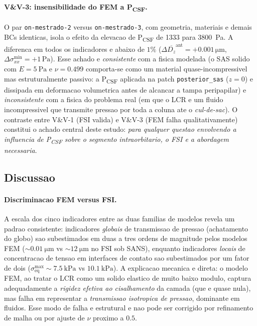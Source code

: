 \paragraph{V\&V-3: insensibilidade do FEM a P\textsubscript{CSF}.} O par \texttt{on-mestrado-2} versus \texttt{on-mestrado-3}, com geometria, materiais e demais BCs identicas, isola o efeito da elevacao de P\textsubscript{CSF} de \SI{1333}{} para \SI{3800}{\pascal}. A diferenca em todos os indicadores e abaixo de $1\%$ ($\Delta \overline{D_z}^{\mathrm{ant}} = +0.001\,\si{\micro\meter}$, $\Delta \sigma_{xx}^{\min} = +1\,\si{\pascal}$). Esse achado e \emph{consistente} com a fisica modelada (o SAS solido com $E = \SI{5}{\pascal}$ e $\nu = 0.499$ comporta-se como um material quase-incompressivel mas estruturalmente passivo: a P\textsubscript{CSF} aplicada na patch \texttt{posterior\_sas} ($z = 0$) e dissipada em deformacao volumetrica antes de alcancar a tampa peripapilar) e \emph{inconsistente} com a fisica do problema real (em que o LCR e um fluido incompressivel que transmite pressao por toda a coluna ate o \emph{cul-de-sac}). O contraste entre V\&V-1 (FSI valida) e V\&V-3 (FEM falha qualitativamente) constitui o achado central deste estudo: \emph{para qualquer questao envolvendo a influencia de P\textsubscript{CSF} sobre o segmento intraorbitario, o FSI e a abordagem necessaria}.

\subsection{Discussao}
\label{sec:resultados-discussao}

\paragraph{Discriminacao FEM versus FSI.} A escala dos cinco indicadores entre as duas familias de modelos revela um padrao consistente: indicadores \emph{globais} de transmissao de pressao (achatamento do globo) sao subestimados em duas a tres ordens de magnitude pelos modelos FEM ($\sim \SI{0.01}{\micro\meter}$ vs $\sim \SI{12}{\micro\meter}$ no FSI sob SANS), enquanto indicadores \emph{locais} de concentracao de tensao em interfaces de contato sao subestimados por um fator de dois ($\sigma_{\mathrm{eq}}^{\max} \sim \SI{7.5}{\kilo\pascal}$ vs $\SI{10.1}{\kilo\pascal}$). A explicacao mecanica e direta: o modelo FEM, ao tratar o LCR como um solido elastico de muito baixo modulo, captura adequadamente a \emph{rigidez efetiva ao cisalhamento} da camada (que e quase nula), mas falha em representar a \emph{transmissao isotropica de pressao}, dominante em fluidos. Esse modo de falha e estrutural e nao pode ser corrigido por refinamento de malha ou por ajuste de $\nu$ proximo a $0.5$.

